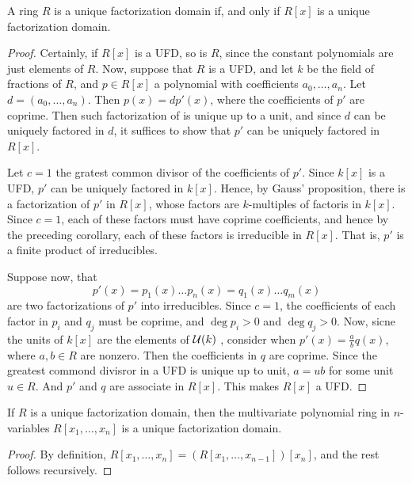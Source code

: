 \begin{theorem}\label{proposition_7.2.2}
  A ring $R$ is a unique factorization domain if, and only if  $R[x]$ is a
  unique factorization domain.
\end{theorem}
\begin{proof}
  Certainly, if $R[x]$ is a UFD, so is $R$, since the constant polynomials
  are just elements of  $R$. Now, suppose that  $R$ is a UFD, and let $k$ be
  the field of fractions of  $R$, and  $p \in R[x]$ a polynomial with
  coefficients $a_0, \dots, a_n$. Let $d=(a_0, \dots, a_n)$. Then
  $p(x)=dp'(x)$, where the coefficients of $p'$ are coprime. Then such
  factorization of is unique up to a unit, and since $d$ can be uniquely
  factored in  $d$, it suffices to show that  $p'$ can be uniquely factored in
  $R[x]$.

  Let $c=1$ the gratest common divisor of the coefficients of  $p'$. Since
  $k[x]$ is a UFD, $p'$ can be uniquely factored in  $k[x]$. Hence, by
  Gauss' proposition, there is a factorization of $p'$ in  $R[x]$, whose factors
  are $k$-multiples of factoris in $k[x]$. Since $c=1$, each of these
  factors must have coprime coefficients, and hence by the preceding
  corollary, each of these factors is irreducible in $R[x]$. That is, $p'$ is
  a finite product of irreducibles.

  Suppose now, that
  \begin{equation*}
    p'(x)=p_1(x) \dots p_n(x)=q_1(x) \dots q_m(x)
  \end{equation*}
  are two factorizations of $p'$ into irreducibles. Since  $c=1$, the
  coefficients of each factor in $p_i$ and  $q_j$ must be coprime, and
  $\deg{p_i}>0$ and $\deg{q_j}>0$. Now, sicne the units of $k[x]$ are the
  elements of $\mathcal{U}(k)$ , consider when $p'(x)=\frac{a}{b}q(x)$, where $a,b
  \in R$ are nonzero. Then the coefficients in $q$ are coprime. Since the
  greatest commond divisror in a UFD is unique up to unit,  $a=ub$ for some
  unit  $u \in R$. And  $p'$ and $q$ are associate in $R[x]$. This makes
  $R[x]$ a UFD.
\end{proof}
\begin{corollary}
  If $R$ is a unique factorization domain, then the multivariate polynomial
  ring in  $n$-variables  $R[x_1, \dots, x_n]$ is a unique factorization
  domain.
\end{corollary}
\begin{proof}
  By definition, $R[x_1, \dots, x_n]=(R[x_1, \dots, x_{n-1}])[x_n]$, and the
  rest follows recursively.
\end{proof}

